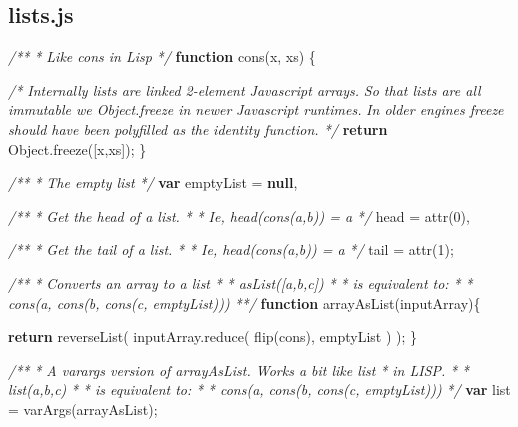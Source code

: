\documentclass[]{article}
\newenvironment{Shaded}{}{}
\newcommand{\KeywordTok}[1]{\textcolor[rgb]{0.00,0.44,0.13}{\textbf{{#1}}}}
\newcommand{\DecValTok}[1]{\textcolor[rgb]{0.25,0.63,0.44}{{#1}}}
\newcommand{\CommentTok}[1]{\textcolor[rgb]{0.38,0.63,0.69}{\textit{{#1}}}}
\newcommand{\OtherTok}[1]{\textcolor[rgb]{0.00,0.44,0.13}{{#1}}}
\newcommand{\FunctionTok}[1]{\textcolor[rgb]{0.02,0.16,0.49}{{#1}}}
\newcommand{\NormalTok}[1]{{#1}}
\begin{document}
\pagebreak

\subsection{lists.js}

\begin{Shaded}
\begin{Highlighting}[]
\CommentTok{/**}
\CommentTok{ * Like cons in Lisp}
\CommentTok{ */}
\KeywordTok{function} \FunctionTok{cons}\NormalTok{(x, xs) \{}
   
   \CommentTok{/* Internally lists are linked 2-element Javascript arrays.}
\CommentTok{    }
\CommentTok{      So that lists are all immutable we Object.freeze in newer }
\CommentTok{      Javascript runtimes.}
\CommentTok{      }
\CommentTok{      In older engines freeze should have been polyfilled as the }
\CommentTok{      identity function. */}
   \KeywordTok{return} \OtherTok{Object}\NormalTok{.}\FunctionTok{freeze}\NormalTok{([x,xs]);}
\NormalTok{\}}

\CommentTok{/**}
\CommentTok{ * The empty list}
\CommentTok{ */}
\KeywordTok{var} \NormalTok{emptyList = }\KeywordTok{null}\NormalTok{,}

\CommentTok{/**}
\CommentTok{ * Get the head of a list.}
\CommentTok{ * }
\CommentTok{ * Ie, head(cons(a,b)) = a}
\CommentTok{ */}
    \NormalTok{head = }\FunctionTok{attr}\NormalTok{(}\DecValTok{0}\NormalTok{),}

\CommentTok{/**}
\CommentTok{ * Get the tail of a list.}
\CommentTok{ * }
\CommentTok{ * Ie, head(cons(a,b)) = a}
\CommentTok{ */}
    \NormalTok{tail = }\FunctionTok{attr}\NormalTok{(}\DecValTok{1}\NormalTok{);}


\CommentTok{/** }
\CommentTok{ * Converts an array to a list }
\CommentTok{ * }
\CommentTok{ *    asList([a,b,c])}
\CommentTok{ * }
\CommentTok{ * is equivalent to:}
\CommentTok{ *    }
\CommentTok{ *    cons(a, cons(b, cons(c, emptyList))) }
\CommentTok{ **/}
\KeywordTok{function} \FunctionTok{arrayAsList}\NormalTok{(inputArray)\{}

   \KeywordTok{return} \FunctionTok{reverseList}\NormalTok{( }
      \OtherTok{inputArray}\NormalTok{.}\FunctionTok{reduce}\NormalTok{(}
         \FunctionTok{flip}\NormalTok{(cons),}
         \NormalTok{emptyList }
      \NormalTok{)}
   \NormalTok{);}
\NormalTok{\}}

\CommentTok{/**}
\CommentTok{ * A varargs version of arrayAsList. Works a bit like list}
\CommentTok{ * in LISP.}
\CommentTok{ * }
\CommentTok{ *    list(a,b,c) }
\CommentTok{ *    }
\CommentTok{ * is equivalent to:}
\CommentTok{ * }
\CommentTok{ *    cons(a, cons(b, cons(c, emptyList)))}
\CommentTok{ */}
\KeywordTok{var} \NormalTok{list = }\FunctionTok{varArgs}\NormalTok{(arrayAsList);}


\end{Highlighting}
\end{Shaded}
\end{document}
